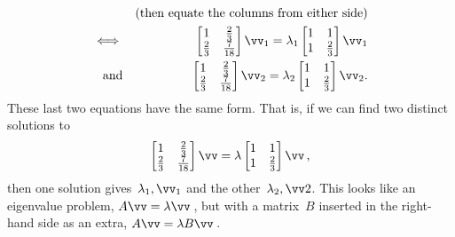 \begin{draft}
\begin{example}
\begin{solution}
\begin{enumerate}
\begin{eqnarray*}
\\&&(\text{then equate the columns from either side})
\\\iff&&\begin{bmatrix} 1&\tfrac23\\\tfrac23&\frac7{18} \end{bmatrix}\vv_1=\lambda_1\begin{bmatrix} 1&1\\1&\tfrac23 \end{bmatrix}\vv_1
\\\text{and}&&\begin{bmatrix} 1&\tfrac23\\\tfrac23&\frac7{18} \end{bmatrix}\vv_2=\lambda_2\begin{bmatrix} 1&1\\1&\tfrac23 \end{bmatrix}\vv_2.
\end{eqnarray*}
These last two equations have the same form.
That is, if we can find two distinct solutions to
\begin{equation*}
\begin{bmatrix} 1&\tfrac23\\\tfrac23&\frac7{18} \end{bmatrix}\vv=\lambda\begin{bmatrix} 1&1\\1&\tfrac23 \end{bmatrix}\vv\,,
\end{equation*}
then one solution gives~\(\lambda_1,\vv_1\) and the other~\(\lambda_2,\vv2\).
This looks like an eigenvalue problem, \(A\vv=\lambda\vv\)\,, but with a matrix~\(B\) inserted in the right-hand side as an extra, \(A\vv=\lambda B\vv\)\,.


\end{enumerate}
\end{solution}
\end{example}
\end{draft}
